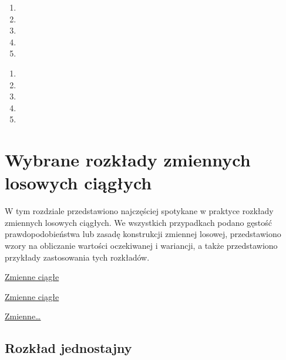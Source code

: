 \documentclass[
  letterpaper,
  DIV=11,
  numbers=noendperiod]{scrreprt}
\providecommand{\tightlist}{%
  \setlength{\itemsep}{0pt}\setlength{\parskip}{0pt}}\usepackage{longtable,booktabs,array}
\begin{document}
\begin{enumerate}
\def\labelenumi{\arabic{enumi}.}
\tightlist
\item
\item
\item
\item
\item
\end{enumerate}

\begin{tcolorbox}[enhanced jigsaw, toprule=.15mm, title={Pytania testowe}, breakable, coltitle=black, titlerule=0mm, colbacktitle=quarto-callout-important-color!10!white, opacitybacktitle=0.6, opacityback=0, bottomtitle=1mm, left=2mm, arc=.35mm, leftrule=.75mm, bottomrule=.15mm, rightrule=.15mm, toptitle=1mm, colframe=quarto-callout-important-color-frame, colback=white]

\end{tcolorbox}

\begin{enumerate}
\def\labelenumi{\arabic{enumi}.}
\tightlist
\item
\item
\item
\item
\item
\end{enumerate}


\chapter{Wybrane rozkłady zmiennych losowych
ciągłych}\label{wybrane-rozkux142ady-zmiennych-losowych-ciux105gux142ych}

W tym rozdziale przedstawiono najczęściej spotykane w praktyce rozkłady
zmiennych losowych ciągłych. We wszystkich przypadkach podano gęstość
prawdopodobieństwa lub zasadę konstrukcji zmiennej losowej,
przedstawiono wzory na obliczanie wartości oczekiwanej i wariancji, a
także przedstawiono przykłady zastosowania tych rozkładów.

\href{https://home.agh.edu.pl/~adan/wyklady/siod3-2014.pdf}{Zmienne
ciągłe}

\href{https://wyznacznik.pl/zmienne-losowe-ciagle-zadania}{Zmienne
ciągłe}

\href{https://merlin.up.poznan.pl/~strabel/dydaktyka/statystyka/ciagla.pdf}{Zmienne\ldots{}}

\section{Rozkład jednostajny}\label{rozkux142ad-jednostajny}
\end{document}
